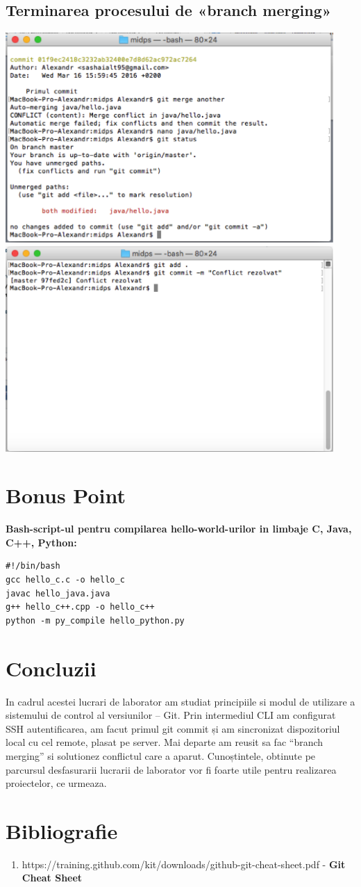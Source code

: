 \documentclass[12pt]{article}
\begin{document}
\subsection{Terminarea procesului de «branch merging»}
\includegraphics[width=12.5cm]{images/26}\\
\includegraphics[width=12.5cm]{images/27}
\section {Bonus Point}
\textbf{Bash-script-ul pentru compilarea hello-world-urilor in limbaje C, Java, C++, Python:}\\

\begin{lstlisting}
#!/bin/bash
gcc hello_c.c -o hello_c
javac hello_java.java
g++ hello_c++.cpp -o hello_c++
python -m py_compile hello_python.py
\end{lstlisting}

\section*{Concluzii}
In cadrul acestei lucrari de laborator am studiat principiile si modul de utilizare a sistemului de control al versiunilor – Git. Prin intermediul CLI am configurat SSH autentificarea, am facut primul git commit și am sincronizat dispozitoriul local cu cel remote, plasat pe server. Mai departe am reusit sa fac “branch merging” si solutionez conflictul care a aparut. Cunoștintele, obtinute pe parcursul desfasurarii lucrarii de laborator vor fi foarte utile pentru realizarea proiectelor, ce urmeaza.
\section*{Bibliografie}
\begin{enumerate}
	\item https://training.github.com/kit/downloads/github-git-cheat-sheet.pdf - \textbf{Git Cheat Sheet}
\end{enumerate}
\end{document}
